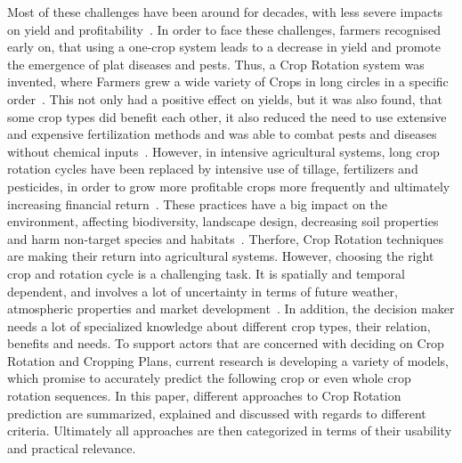 \documentclass{Academic}
\begin{document}
    Most of these challenges have been around for decades, with less severe impacts on yield and profitability~\cite{curl_control_1963, upcott_new_2023}. In order to face these challenges, farmers recognised early on, that using a one-crop system leads to a decrease in yield and promote the emergence of plat diseases and pests. Thus, a Crop Rotation system was invented, where Farmers grew a wide variety of Crops in long circles in a specific order~\cite{noauthor_crop_2023, curl_control_1963}. This not only had a positive effect on yields, but it was also found, that some crop types did benefit each other, it also reduced the need to use extensive and expensive fertilization methods and was able to combat pests and diseases without chemical inputs~\cite{curl_control_1963}. However, in intensive agricultural systems, long crop rotation cycles have been replaced by intensive use of tillage, fertilizers and pesticides, in order to grow more profitable crops more frequently and ultimately increasing financial return~\cite{upcott_new_2023}. These practices have a big impact on the environment, affecting biodiversity, landscape design, decreasing soil properties and harm non-target species and habitats~\cite{upcott_new_2023, dury_models_2012}. Therfore, Crop Rotation techniques are making their return into agricultural systems. However, choosing the right crop and rotation cycle is a challenging task. It is spatially and temporal dependent, and involves a lot of uncertainty in terms of future weather, atmospheric properties and market development~\cite{upcott_new_2023, noauthor_crop_2023, pragathi_crop_nodate}. In addition, the decision maker needs a lot of specialized knowledge about different crop types, their relation, benefits and needs. To support actors that are concerned with deciding on Crop Rotation and Cropping Plans, current research is developing a variety of models, which promise to accurately predict the following crop or even whole crop rotation sequences. In this paper, different approaches to Crop Rotation prediction are summarized, explained and discussed with regards to different criteria. Ultimately all approaches are then categorized in terms of their usability and practical relevance.
\end{document}
